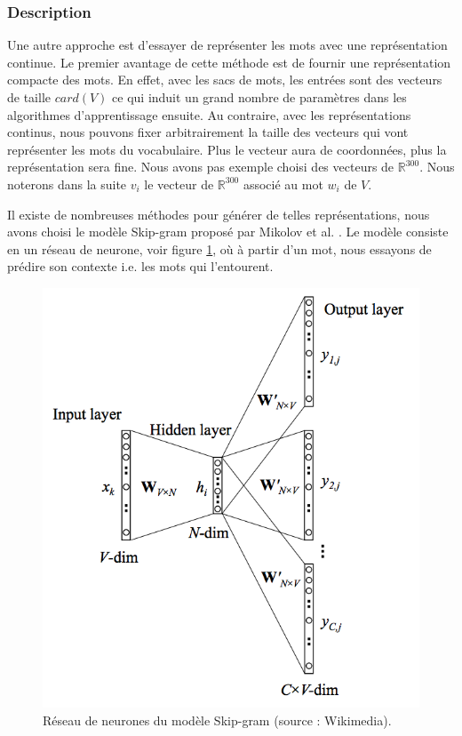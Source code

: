 \documentclass{article}
\begin{document}
\subsubsection{Description}

Une autre approche est d'essayer de représenter les mots avec une représentation continue. Le premier avantage de cette méthode est de fournir une représentation compacte des mots. En effet, avec les sacs de mots, les entrées sont des vecteurs de taille $card(V)$ ce qui induit un grand nombre de paramètres dans les algorithmes d'apprentissage ensuite. Au contraire, avec les représentations continus, nous pouvons fixer arbitrairement la taille des vecteurs qui vont représenter les mots du vocabulaire. Plus le vecteur aura de coordonnées, plus la représentation sera fine. Nous avons pas exemple choisi des vecteurs de $\mathbb{R}^{300}$. Nous noterons dans la suite $v_{i}$ le vecteur de $\mathbb{R}^{300}$ associé au mot $w_{i}$ de $V$.

Il existe de nombreuses méthodes pour générer de telles représentations, nous avons choisi le modèle Skip-gram proposé par Mikolov et al. \cite{mikolov2013efficient} \cite{mikolov2013distributed}. Le modèle consiste en un réseau de neurone, voir figure \ref{skip_gram}, où à partir d'un mot, nous essayons de prédire son contexte i.e. les mots qui l'entourent.

\begin{figure}[h]
\begin{center}
\includegraphics{images/skip_gram.png}
\caption{Réseau de neurones du modèle Skip-gram (source : Wikimedia).}
\label{skip_gram}
\end{center}
\end{figure}
\end{document}
